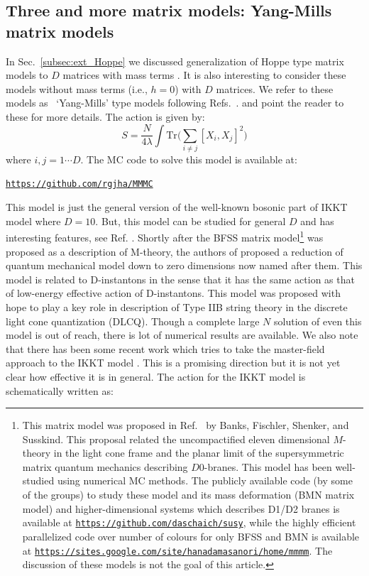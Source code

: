 \documentclass[11pt]{article}
\begin{document}
\subsection{Three and more matrix models: Yang-Mills matrix models}
In Sec.~\ref{subsec:ext_Hoppe} we discussed generalization of Hoppe type matrix models to $D$ matrices
with mass terms . It is also interesting to consider these models without mass terms (i.e., $h=0$) with $D$ matrices. 
We refer to these models as ~`Yang-Mills' type models following Refs.~\cite{Krauth:1998yu,Krauth:1999qw}. 
and point the reader to these for more details. The action is given by: 
\begin{equation}
	\label{eq:CTmodel} 
S = \frac{N}{4\lambda} \int \mbox{Tr} \Bigg( \sum_{i \neq j}[X_i, X_j]^{2}\Bigg) 
\end{equation}
where $i, j = 1 \cdots D$. The MC code to solve this model is available at:
\begin{center} \texttt{\href{https://github.com/rgjha/MMMC}{https://github.com/rgjha/MMMC}} \end{center}
This model is just the general version of the well-known bosonic part of IKKT model
where $D=10$. But, this model can be studied for general $D$ and has interesting features, see Ref. \cite{Hotta:1998en}. 
Shortly after the BFSS matrix model\footnote{This matrix model was proposed in Ref.~\cite{Banks:1996vh} by
Banks, Fischler, Shenker, and Susskind. This proposal related the 
uncompactified eleven dimensional $M$-theory in the light cone frame and the 
planar limit of the supersymmetric matrix quantum mechanics describing $D0$-branes. This model has been
well-studied using numerical MC methods\cite{Catterall:2007fp,Hanada:2008ez,Filev:2015hia,Berkowitz:2016tyy}. The publicly available code (by some of the groups) to study these model and its mass deformation (BMN matrix model) and higher-dimensional systems which describes D1/D2 branes 
\cite{Catterall:2017lub,Jha:2017zad,Catterall:2020nmn}
is available at \texttt{\href{https://github.com/daschaich/susy}{https://github.com/daschaich/susy}}, while the
highly efficient parallelized code over number of colours for only BFSS and BMN is available at
\texttt{\href{https://sites.google.com/site/hanadamasanori/home/mmmm}
{https://sites.google.com/site/hanadamasanori/home/mmmm}}.
The discussion of these models is not the goal of this article. 
}
was proposed as a description of M-theory, the authors of 
\cite{Ishibashi:1996xs} proposed a reduction of quantum mechanical model down to zero 
dimensions now named after them. This model is related to D-instantons 
in the sense that it has the same action as that of low-energy effective action of D-instantons. 
This model was proposed with hope to play a key role in description of Type IIB string theory in 
the discrete light cone quantization (DLCQ). Though a complete large $N$ solution of even this model 
is out of reach, there is lot of numerical results are available. 
We also note that there has been some recent work which tries to take the master-field approach to the
IKKT model \cite{Klinkhamer:2021wrv}. This is a promising direction but it is not yet clear how effective 
it is in general. The action for the IKKT model is schematically written as:
\end{document}
